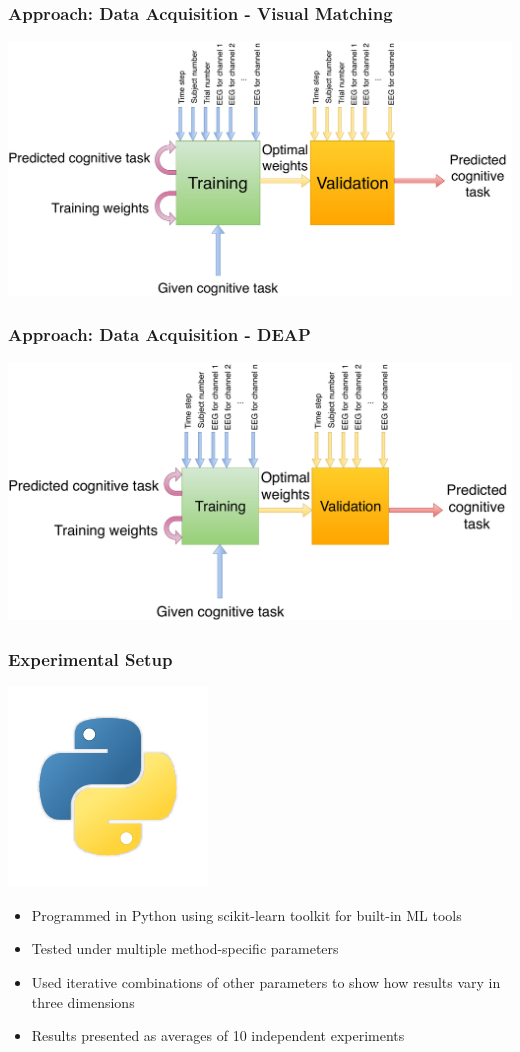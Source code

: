 \documentclass{beamer}
\begin{document}
\begin{frame}
\frametitle{Approach: Data Acquisition - Visual Matching}
\includegraphics[width=\textwidth]{vismatch-io}
\end{frame}

\begin{frame}
\frametitle{Approach: Data Acquisition - DEAP}
\includegraphics[width=\textwidth]{deap-io}
\end{frame}

\begin{frame}
\frametitle{Experimental Setup}
\begin{center}
\includegraphics[width=.2\textwidth]{python}
\end{center}
\begin{itemize}
\item{Programmed in Python using scikit-learn toolkit for built-in ML tools}
\item{Tested under multiple method-specific parameters}
\item{Used iterative combinations of other parameters to show how results vary in three dimensions}
\item{Results presented as averages of 10 independent experiments}
\end{itemize}
\end{frame}
\end{document}
